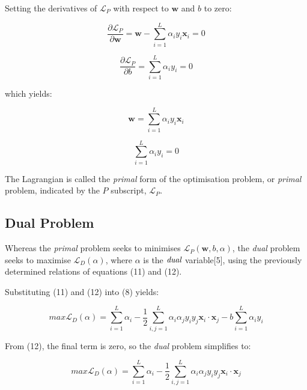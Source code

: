 \documentclass[10pt, a4paper,reqno]{amsart}
\begin{document}
Setting the derivatives of $\mathcal{L}_P$ with respect to $\mathbf{w}$ and $b$ to zero:

\begin{equation}
\frac{\partial \mathcal{L}_P}{\partial \mathbf{w}} = \mathbf{w} -  \sum_{i=1}^{L}\alpha_i y_i \mathbf{x}_i = 0
\end{equation}
 
\begin{equation}
\frac{\partial \mathcal{L}_P}{\partial b} = \sum_{i=1}^{L}\alpha_i y_i = 0
\end{equation}

which yields:

\begin{equation}
\mathbf{w} = \sum_{i=1}^{L}\alpha_i y_i \mathbf{x}_i
\end{equation}

\begin{equation}
\sum_{i=1}^{L}\alpha_i y_i = 0
\end{equation}

The Lagrangian is called the \emph{primal} form of the optimisation problem, or \emph{primal} problem, indicated by the $P$ subscript, $\mathcal{L}_P$.

\subsection{Dual Problem}

Whereas the \emph{primal} problem seeks to minimises $\mathcal{L}_P(\mathbf{w}, b, \alpha)$, the \emph{dual} problem seeks to maximise $\mathcal{L}_D(\alpha)$, where $\alpha$ is the $\emph{dual}$ variable[5], using the previously determined relations of equations (11) and (12).

Substituting (11) and (12) into (8) yields:

\begin{equation}
max\mathcal{L}_D(\alpha) = \sum_{i=1}^{L}\alpha_i - \frac{1}{2}\sum_{i,j=1}^{L}\alpha_i \alpha_j y_i y_j\mathbf{x}_i\cdot\mathbf{x}_j - b\sum_{i=1}^{L}\alpha_i y_i
\end{equation}

From (12), the final term is zero, so the \emph{dual} problem simplifies to:

\begin{equation}
max\mathcal{L}_D(\alpha) = \sum_{i=1}^{L}\alpha_i - \frac{1}{2}\sum_{i,j=1}^{L}\alpha_i \alpha_j y_i y_j\mathbf{x}_i\cdot\mathbf{x}_j
\end{equation}
\end{document}
